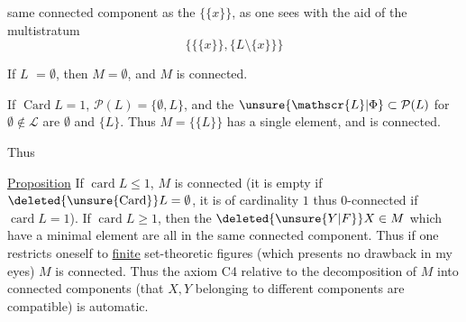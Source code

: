 same connected component as the $\{\{x\}\}$, as one sees with the aid of the multistratum
\[
\bigl\{\{\{x\}\},\{L\setminus\{x\}\}\bigr\}
\]

If $L$  $=\emptyset$,   then $M=\emptyset$, and $M$ is connected.

If $\operatorname{Card}L=1$, $\mathcal P(L)=\{\emptyset,L\}$, and the $\unsure{\mathscr{L}|\Phi}\subset\mathcal P(L)$    for $\emptyset\notin\mathscr{L}$ are $\emptyset$ and $\{L\}$. Thus $M=\{\{L\}\}$ has a single element, and is connected.

Thus

\uline{Proposition} If $\operatorname{card}L\leq1$, $M$ is connected (it is empty if $\deleted{\unsure{\mathrm{Card}}}L=\emptyset$, it is of cardinality $1$ thus $0$-connected if $\operatorname{card}L=1$). If $\operatorname{card}L\geq1$, then the $\deleted{\unsure{Y|F}}X\in M$ which have a minimal element are all in the same connected component. Thus if one restricts oneself to  \uline{finite} set-theoretic figures (which presents no drawback in my eyes) $M$ is connected. Thus the axiom C4  relative to the decomposition of $M$ into connected components (that $X,Y$ belonging to different components are compatible) is automatic.
